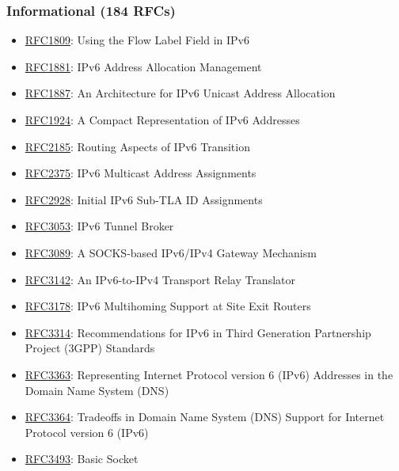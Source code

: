 \documentclass[
]{article}
\providecommand{\tightlist}{%
  \setlength{\itemsep}{0pt}\setlength{\parskip}{0pt}}
\begin{document}
\subsubsection{Informational (184 RFCs)}\label{informational-184-rfcs}

\begin{itemize}
\tightlist
\item
  \href{https://www.rfc-editor.org/info/rfc1809}{RFC1809}: Using the
  Flow Label Field in IPv6
\item
  \href{https://www.rfc-editor.org/info/rfc1881}{RFC1881}: IPv6 Address
  Allocation Management
\item
  \href{https://www.rfc-editor.org/info/rfc1887}{RFC1887}: An
  Architecture for IPv6 Unicast Address Allocation
\item
  \href{https://www.rfc-editor.org/info/rfc1924}{RFC1924}: A Compact
  Representation of IPv6 Addresses
\item
  \href{https://www.rfc-editor.org/info/rfc2185}{RFC2185}: Routing
  Aspects of IPv6 Transition
\item
  \href{https://www.rfc-editor.org/info/rfc2375}{RFC2375}: IPv6
  Multicast Address Assignments
\item
  \href{https://www.rfc-editor.org/info/rfc2928}{RFC2928}: Initial IPv6
  Sub-TLA ID Assignments
\item
  \href{https://www.rfc-editor.org/info/rfc3053}{RFC3053}: IPv6 Tunnel
  Broker
\item
  \href{https://www.rfc-editor.org/info/rfc3089}{RFC3089}: A SOCKS-based
  IPv6/IPv4 Gateway Mechanism
\item
  \href{https://www.rfc-editor.org/info/rfc3142}{RFC3142}: An
  IPv6-to-IPv4 Transport Relay Translator
\item
  \href{https://www.rfc-editor.org/info/rfc3178}{RFC3178}: IPv6
  Multihoming Support at Site Exit Routers
\item
  \href{https://www.rfc-editor.org/info/rfc3314}{RFC3314}:
  Recommendations for IPv6 in Third Generation Partnership Project
  (3GPP) Standards
\item
  \href{https://www.rfc-editor.org/info/rfc3363}{RFC3363}: Representing
  Internet Protocol version 6 (IPv6) Addresses in the Domain Name System
  (DNS)
\item
  \href{https://www.rfc-editor.org/info/rfc3364}{RFC3364}: Tradeoffs in
  Domain Name System (DNS) Support for Internet Protocol version 6
  (IPv6)
\item
  \href{https://www.rfc-editor.org/info/rfc3493}{RFC3493}: Basic Socket

\end{itemize}
\end{document}
